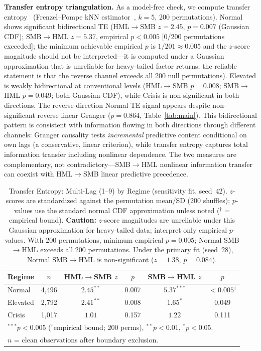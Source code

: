 \documentclass[sigconf,anonymous]{acmart}
\begin{document}
\textbf{Transfer entropy triangulation.}
As a model-free check, we compute transfer entropy~\cite{schreiber2000measuring,marschinski2002analysing,frenzel2007partial}
(Frenzel--Pompe kNN estimator~\cite{frenzel2007partial}, $k=5$, 200 permutations).
Normal shows significant bidirectional TE (HML$\to$SMB $z = 2.45$, $p = 0.007$
(Gaussian CDF); SMB$\to$HML $z = 5.37$, empirical $p < 0.005$ [0/200 permutations exceeded];
the minimum achievable empirical $p$ is $1/201 \approx 0.005$ and the $z$-score
magnitude should not be interpreted---it is computed under a Gaussian approximation
that is unreliable for heavy-tailed factor returns; the reliable statement is
that the reverse channel exceeds all 200 null permutations). Elevated is weakly bidirectional at
conventional levels (HML$\to$SMB $p = 0.008$; SMB$\to$HML $p = 0.049$; both Gaussian CDF),
while Crisis is non-significant in both directions. The reverse-direction Normal TE
signal appears despite non-significant reverse linear Granger
($p = 0.864$, Table~\ref{tab:main}).
This bidirectional pattern is consistent with information flowing in both directions
through different channels: Granger causality tests \emph{incremental} predictive
content conditional on own lags (a conservative, linear criterion), while transfer
entropy captures total information transfer including nonlinear dependence.
The two measures are complementary, not contradictory---SMB$\to$HML
nonlinear information transfer can coexist with HML$\to$SMB linear
predictive precedence.

\begin{table}[t]
\centering
\caption{Transfer Entropy: Multi-Lag (1--9) by Regime (sensitivity fit, seed~42).
$z$-scores are standardized against the permutation mean/SD (200 shuffles);
$p$-values use the standard normal CDF approximation unless noted ($^\dagger$ = empirical bound).
\textbf{Caution:} $z$-score magnitudes are unreliable under this Gaussian approximation for heavy-tailed data;
interpret only empirical $p$-values. With 200 permutations, minimum empirical $p = 0.005$;
Normal SMB$\to$HML exceeds all 200 permutations.
Under the primary fit (seed~28), Normal SMB$\to$HML is non-significant ($z = 1.38$, $p = 0.084$).}
\label{tab:te}
\scriptsize
\begin{tabular}{@{}lccccc@{}}
\toprule
Regime & $n$ & HML$\to$SMB $z$ & $p$ & SMB$\to$HML $z$ & $p$ \\
\midrule
Normal & 4,496 & $2.45^{**}$ & 0.007 & $5.37^{***}$ & $<0.005^\dagger$ \\
Elevated & 2,792 & $2.41^{**}$ & 0.008 & $1.65^{*}$ & 0.049 \\
Crisis & 1,017 & $1.01$ & 0.157 & $1.22$ & 0.111 \\
\bottomrule
\multicolumn{6}{l}{\footnotesize $^{***}p < 0.005$ ($^\dagger$empirical bound; 200 perms), $^{**}p < 0.01$, $^{*}p < 0.05$.} \\
\multicolumn{6}{l}{\footnotesize $n$ = clean observations after boundary exclusion.} \\
\end{tabular}
\end{table}
\end{document}
